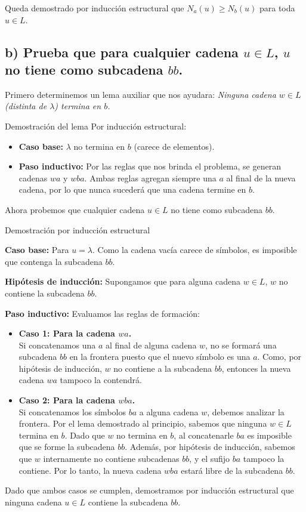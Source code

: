 Queda demostrado por inducción estructural que $N_a(u) \ge N_b(u)$ para toda $u \in L$.



\subsection*{b) Prueba que para cualquier cadena $u \in L$, $u$ no tiene como subcadena $bb$.}

Primero determinemos un lema auxiliar que nos ayudara: 
\textit{Ninguna cadena $w \in L$ (distinta de $\lambda$) termina en $b$.}

Demostración del lema
Por inducción estructural:
\begin{itemize}
    \item \textbf{Caso base:} $\lambda$ no termina en $b$ (carece de elementos).
    \item \textbf{Paso inductivo:} Por las reglas que nos brinda el problema, se generan cadenas $wa$ y $wba$. Ambas reglas agregan siempre una $a$ al final de la nueva cadena, por lo que nunca sucederá que una cadena termine en $b$.
\end{itemize}


Ahora probemos que cualquier cadena $u \in L$ no tiene como subcadena $bb$.

Demostración por inducción estructural


\textbf{Caso base:} Para $u = \lambda$. Como la cadena vacía carece de símbolos, es imposible que contenga la subcadena $bb$.

\textbf{Hipótesis de inducción:} Supongamos que para alguna cadena $w \in L$, $w$ no contiene la subcadena $bb$.

\textbf{Paso inductivo:} Evaluamos las reglas de formación:
\begin{itemize}
    \item \textbf{Caso 1: Para la cadena $wa$.} \\
    Si concatenamos una $a$ al final de alguna cadena $w$, no se formará una subcadena $bb$ en la frontera puesto que el nuevo símbolo es una $a$. Como, por hipótesis de inducción, $w$ no contiene a la subcadena $bb$, entonces la nueva cadena $wa$ tampoco la contendrá.

    \item \textbf{Caso 2: Para la cadena $wba$.} \\
    Si concatenamos los símbolos $ba$ a alguna cadena $w$, debemos analizar la frontera. Por el lema demostrado al principio, sabemos que ninguna $w \in L$ termina en $b$. Dado que $w$ no termina en $b$, al concatenarle $ba$ es imposible que se forme la subcadena $bb$. Además, por hipótesis de inducción, sabemos que $w$ internamente no contiene subcadenas $bb$, y el sufijo $ba$ tampoco la contiene. Por lo tanto, la nueva cadena $wba$ estará libre de la subcadena $bb$.
\end{itemize}

Dado que ambos casos se cumplen, demostramos por inducción estructural que ninguna cadena $u \in L$ contiene la subcadena $bb$.

